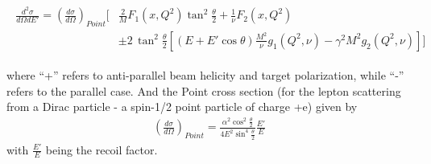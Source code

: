 \begin{comment}
\begin{eqnarray}
\label{diffXS2}
\frac{d^2\sigma}{d\Omega dE'} = \left(\frac{d\sigma}{d\Omega}\right)_{Point}
 \left( \frac{2}{M}F_1(x,Q^2) \tan^2 \frac{\theta}{2} + \frac{1}{\nu} F_2(x,Q^2) \right)
\end{eqnarray}

\begin{equation*}
  \begin{aligned}
    \frac{d^2\sigma}{d\Omega dE'}  
    = \left(\frac{d\sigma}{d\Omega}\right)_{Point}  
    \Bigg[ &  %
       \frac{2}{M} F_1(x,Q^2) \tan^2 \frac{\theta}{2} + \frac{1}{\nu} F_2(x,Q^2) \\
     & \pm  2\, \tan^2 \frac{\theta}{2} 
     \left[   (E + E' \cos\theta) \frac{M^2}{\nu} g_1(Q^2,\nu) - \gamma^2 M^2 g_2(Q^2,\nu)    \right]
     \Bigg]
  \end{aligned}
\end{equation*}

\end{comment}



\begin{eqnarray}
  \begin{aligned}
    \frac{d^2\sigma}{d\Omega dE'}  
    = \left(\frac{d\sigma}{d\Omega}\right)_{Point}  
    \Bigg[ &  %
       \frac{2}{M} F_1(x,Q^2) \tan^2 \frac{\theta}{2} + \frac{1}{\nu} F_2(x,Q^2) \\
     & \pm  2\, \tan^2 \frac{\theta}{2} 
     \left[   (E + E' \cos\theta) \frac{M^2}{\nu} g_1(Q^2,\nu) - \gamma^2 M^2 g_2(Q^2,\nu)    \right]
     \Bigg]
  \end{aligned}
\end{eqnarray}

where ``+'' refers to anti-parallel beam helicity and target polarization, while ``-'' refers to
the parallel case.  
And the Point %
cross section (for the lepton scattering from a Dirac particle - a spin-1/2 point particle of charge +e) given by
\begin{eqnarray}
\label{MottXS}
\left(\frac{d\sigma}{d\Omega}\right)_{Point} = \frac{\alpha^2 \cos^2 \frac{\theta}{2}}{4E^2 \sin^4\frac{\theta}{2}}
\frac{E'}{E}
\end{eqnarray}
with $\frac{E'}{E}$ being the recoil factor.



